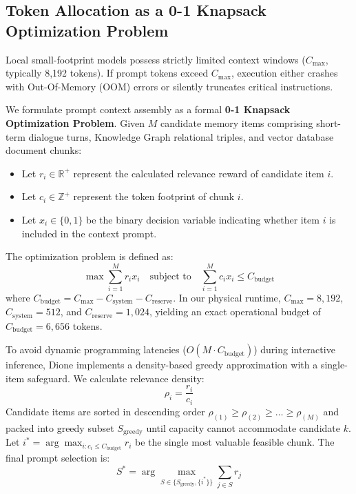 \documentclass[conference,a4paper]{IEEEtran}
\begin{document}
\subsection{Token Allocation as a 0-1 Knapsack Optimization Problem}
Local small-footprint models possess strictly limited context windows ($C_{\text{max}}$, typically 8,192 tokens). If prompt tokens exceed $C_{\text{max}}$, execution either crashes with Out-Of-Memory (OOM) errors or silently truncates critical instructions.

We formulate prompt context assembly as a formal \textbf{0-1 Knapsack Optimization Problem}. Given $M$ candidate memory items comprising short-term dialogue turns, Knowledge Graph relational triples, and vector database document chunks:
\begin{itemize}
    \item Let $r_i \in \mathbb{R}^+$ represent the calculated relevance reward of candidate item $i$.
    \item Let $c_i \in \mathbb{Z}^+$ represent the token footprint of chunk $i$.
    \item Let $x_i \in \{0, 1\}$ be the binary decision variable indicating whether item $i$ is included in the context prompt.
\end{itemize}

The optimization problem is defined as:
\begin{equation}
\max \sum_{i=1}^{M} r_i x_i \quad \text{subject to} \quad \sum_{i=1}^{M} c_i x_i \le C_{\text{budget}}
\end{equation}
where $C_{\text{budget}} = C_{\text{max}} - C_{\text{system}} - C_{\text{reserve}}$. In our physical runtime, $C_{\text{max}} = 8{,}192$, $C_{\text{system}} = 512$, and $C_{\text{reserve}} = 1{,}024$, yielding an exact operational budget of $C_{\text{budget}} = 6{,}656$ tokens.

To avoid dynamic programming latencies ($O(M \cdot C_{\text{budget}})$) during interactive inference, Dione implements a density-based greedy approximation with a single-item safeguard. We calculate relevance density:
\begin{equation}
\rho_i = \frac{r_i}{c_i}
\end{equation}
Candidate items are sorted in descending order $\rho_{(1)} \ge \rho_{(2)} \ge \dots \ge \rho_{(M)}$ and packed into greedy subset $S_{\text{greedy}}$ until capacity cannot accommodate candidate $k$. Let $i^* = \arg\max_{i: c_i \le C_{\text{budget}}} r_i$ be the single most valuable feasible chunk. The final prompt selection is:
\begin{equation}
S^* = \arg\max_{S \in \{S_{\text{greedy}}, \{i^*\}\}} \sum_{j \in S} r_j
\end{equation}
\end{document}
